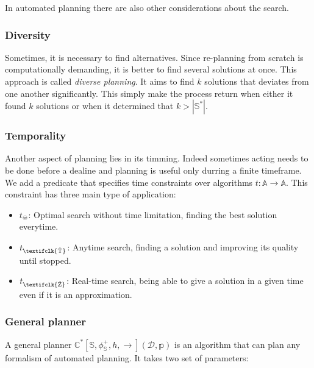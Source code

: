 \documentclass[11pt,a4paper,twoside,openright,titlepage,numbers=noenddot,headinclude,cleardoublepage=empty,openany]{scrreprt}
\theoremstyle{plain}
\theoremstyle{definition}
\theoremstyle{remark}
\providecommand{\tightlist}{%
  \setlength{\itemsep}{0pt}\setlength{\parskip}{0pt}}
\newcommand{\timeout}{\textifclk{\symbol{153}}}
\newcommand{\chrono}{\textifclk{\symbol{148}}}
\newcommand{\bb}{\mathbb}
\renewcommand{\cal}{\mathcal}
\begin{document}
In automated planning there are also other considerations about the
search.

\hypertarget{diversity}{%
\subsubsection{Diversity}\label{diversity}}

Sometimes, it is necessary to find alternatives. Since re-planning from
scratch is computationally demanding, it is better to find several
solutions at once. This approach is called \emph{diverse planning}. It
aims to find \(k\) solutions that deviates from one another
significantly. This simply make the process return when either it found
\(k\) solutions or when it determined that \(k > |\bb{S}^*|\).

\hypertarget{temporality}{%
\subsubsection{Temporality}\label{temporality}}

Another aspect of planning lies in its timming. Indeed sometimes acting
needs to be done before a dealine and planning is useful only durring a
finite timeframe. We add a predicate that specifies time constraints
over algorithms \(t : \bb{A} \to \bb{A}\). This constraint has three
main type of application:

\begin{itemize}
\tightlist
\item
  \(t_\acidfree\): Optimal search without time limitation, finding the
  best solution everytime.
\item
  \(t_\chrono\): Anytime search, finding a solution and improving its
  quality until stopped.
\item
  \(t_\timeout\): Real-time search, being able to give a solution in a
  given time even if it is an approximation.
\end{itemize}

\hypertarget{general-planner}{%
\subsubsection{General planner}\label{general-planner}}

A general planner
\(\bb{C}^*[\bb{S},\phi^+_{\bb{S}},h,\to](\cal{D},\bb{p})\) is an
algorithm that can plan any formalism of automated planning. It takes
two set of parameters:
\end{document}
